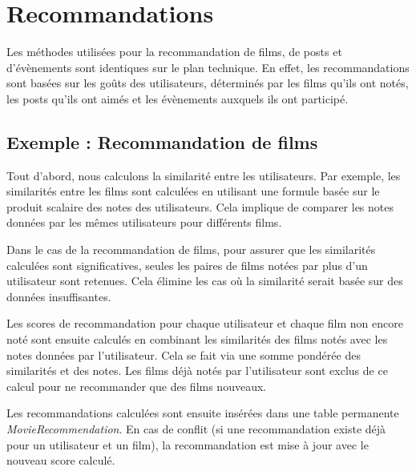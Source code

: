\section{Recommandations}

Les méthodes utilisées pour la recommandation de films, de posts et d'évènements sont identiques sur le plan technique. En effet, les recommandations sont basées sur les goûts des utilisateurs, déterminés par les films qu'ils ont notés, les posts qu'ils ont aimés et les évènements auxquels ils ont participé.

\subsection{Exemple : Recommandation de films}
Tout d'abord, nous calculons la similarité entre les utilisateurs. Par exemple, les similarités entre les films sont calculées en utilisant une formule basée sur le produit scalaire des notes des utilisateurs. Cela implique de comparer les notes données par les mêmes utilisateurs pour différents films.

Dans le cas de la recommandation de films, pour assurer que les similarités calculées sont significatives, seules les paires de films notées par plus d'un utilisateur sont retenues. Cela élimine les cas où la similarité serait basée sur des données insuffisantes.

Les scores de recommandation pour chaque utilisateur et chaque film non encore noté sont ensuite calculés en combinant les similarités des films notés avec les notes données par l'utilisateur. Cela se fait via une somme pondérée des similarités et des notes. Les films déjà notés par l'utilisateur sont exclus de ce calcul pour ne recommander que des films nouveaux.

Les recommandations calculées sont ensuite insérées dans une table permanente \textit{MovieRecommendation}. En cas de conflit (si une recommandation existe déjà pour un utilisateur et un film), la recommandation est mise à jour avec le nouveau score calculé.
